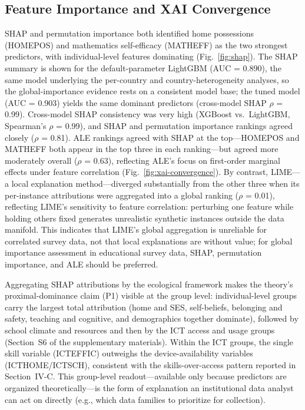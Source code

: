 \documentclass[journal]{IEEEtran}
\begin{document}
\subsection{Feature Importance and XAI Convergence}
SHAP and permutation importance both identified home possessions (HOMEPOS) and mathematics self-efficacy (MATHEFF) as the two strongest predictors, with individual-level features dominating (Fig.~\ref{fig:shap}). The SHAP summary is shown for the default-parameter LightGBM (AUC = 0.890), the same model underlying the per-country and country-heterogeneity analyses, so the global-importance evidence rests on a consistent model base; the tuned model (AUC = 0.903) yields the same dominant predictors (cross-model SHAP $\rho$ = 0.99). Cross-model SHAP consistency was very high (XGBoost vs.\ LightGBM, Spearman's $\rho$ = 0.99), and SHAP and permutation importance rankings agreed closely ($\rho$ = 0.81). ALE rankings agreed with SHAP at the top---HOMEPOS and MATHEFF both appear in the top three in each ranking---but agreed more moderately overall ($\rho$ = 0.63), reflecting ALE's focus on first-order marginal effects under feature correlation (Fig.~\ref{fig:xai-convergence}). By contrast, LIME---a local explanation method---diverged substantially from the other three when its per-instance attributions were aggregated into a global ranking ($\rho$ = 0.01), reflecting LIME's sensitivity to feature correlation: perturbing one feature while holding others fixed generates unrealistic synthetic instances outside the data manifold. This indicates that LIME's global aggregation is unreliable for correlated survey data, not that local explanations are without value; for global importance assessment in educational survey data, SHAP, permutation importance, and ALE should be preferred.

Aggregating SHAP attributions by the ecological framework makes the theory's proximal-dominance claim (P1) visible at the group level: individual-level groups carry the largest total attribution (home and SES, self-beliefs, belonging and safety, teaching and cognitive, and demographics together dominate), followed by school climate and resources and then by the ICT access and usage groups (Section~S6 of the supplementary materials). Within the ICT groups, the single skill variable (ICTEFFIC) outweighs the device-availability variables (ICTHOME/ICTSCH), consistent with the skills-over-access pattern reported in Section~IV-C. This group-level readout---available only because predictors are organized theoretically---is the form of explanation an institutional data analyst can act on directly (e.g., which data families to prioritize for collection).
\end{document}
